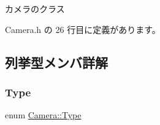 カメラのクラス 

 Camera.\+h の 26 行目に定義があります。



\subsection{列挙型メンバ詳解}
\mbox{\label{class_camera_a3b0a1f58deca679ac665f61c480d1dcb}} 
\subsubsection{\texorpdfstring{Type}{Type}}
{\footnotesize\ttfamily enum \mbox{\hyperlink{class_camera_a3b0a1f58deca679ac665f61c480d1dcb}{Camera\+::\+Type}}}

